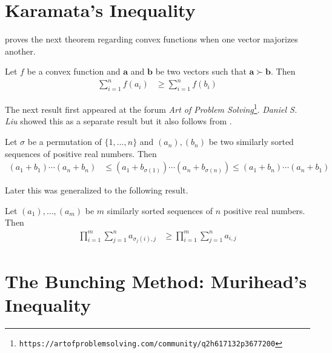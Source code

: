 \documentclass[inequalities.tex]{subfile}
\begin{document}
	\section[Karamata]{Karamata's Inequality}\label{sec:karamata}
	\textcite{karamata_1932} proves the next theorem regarding convex functions when one vector majorizes another.
		\begin{theorem}\label{thm:karamata}
			Let $f$ be a convex function and $\mathbf{a}$ and $\mathbf{b}$ be two vectors such that $\mathbf{a}\succ\mathbf{b}$. Then
				\begin{align*}
					\sum\limits_{i=1}^{n}f(a_{i})
						& \geq \sum\limits_{i=1}^{n}f(b_{i})
				\end{align*}
		\end{theorem}
	The next result first appeared at the forum \textit{Art of Problem Solving}\footnote{\texttt{https://artofproblemsolving.com/community/q2h617132p3677200}}. \textit{Daniel S. Liu} showed this as a separate result but it also follows from .
		\begin{theorem}\label{thm:reverse}
			Let $\sigma$ be a permutation of $\{1,\ldots,n\}$ and $(a_{n}),(b_{n})$ be two similarly sorted sequences of positive real numbers. Then
				\begin{align*}
					(a_{1}+b_{1})\cdots(a_{n}+b_{n})
						& \leq (a_{1}+b_{\sigma(1)})\cdots(a_{n}+b_{\sigma(n)})\leq(a_{1}+b_{n})\cdots(a_{n}+b_{1})
				\end{align*}
		\end{theorem}
	Later this was generalized to the following result.
		\begin{theorem}\label{thm:genreverse}
			Let $(a_{1}),\ldots,(a_{m})$ be $m$ similarly sorted sequences of $n$ positive real numbers. Then
				\begin{align*}
					\prod_{i=1}^{m}\sum\limits_{j=1}^{n}a_{\sigma_{j}(i),j}
						& \geq \prod_{i=1}^{m}\sum\limits_{j=1}^{n}a_{i,j}
				\end{align*}
		\end{theorem}
	\section[Bunching: Muirhead]{The Bunching Method: Murihead's Inequality}\label{sec:bunching}
	
\end{document}
